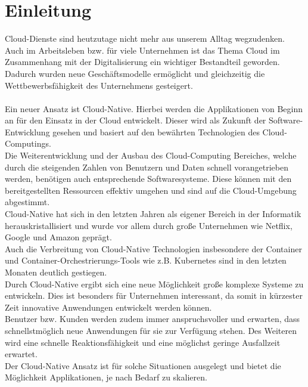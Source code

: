 \chapter{Einleitung}
Cloud-Dienste sind heutzutage nicht mehr aus unserem Alltag wegzudenken. Auch im Arbeitsleben bzw. für viele Unternehmen ist das Thema Cloud im Zusammenhang mit der Digitalisierung ein wichtiger Bestandteil geworden. Dadurch wurden neue Geschäftsmodelle ermöglicht und gleichzeitig die Wettbewerbsfähigkeit des Unternehmens gesteigert.\\
\\
Ein neuer Ansatz ist Cloud-Native. Hierbei werden die Applikationen von Beginn an für den Einsatz in der Cloud entwickelt. Dieser wird als Zukunft der Software-Entwicklung gesehen und basiert auf den bewährten Technologien des Cloud-Computings.\\
Die Weiterentwicklung und der Ausbau des Cloud-Computing Bereiches, welche durch die steigenden Zahlen von Benutzern und Daten schnell vorangetrieben werden, benötigen auch entsprechende Softwaresysteme. Diese können mit den bereitgestellten Ressourcen effektiv umgehen und sind auf die Cloud-Umgebung abgestimmt.\\
Cloud-Native hat sich in den letzten Jahren als eigener Bereich in der Informatik herauskristallisiert und wurde vor allem durch große Unternehmen wie Netflix, Google und Amazon geprägt.\\
Auch die Verbreitung von Cloud-Native Technologien insbesondere der Container und Container-Orchestrierungs-Tools wie z.B. Kubernetes sind in den letzten Monaten deutlich gestiegen.\\
Durch Cloud-Native ergibt sich eine neue Möglichkeit große komplexe Systeme zu entwickeln. Dies ist besonders für Unternehmen interessant, da somit in kürzester Zeit innovative Anwendungen entwickelt werden können.\\
Benutzer bzw. Kunden werden zudem immer anspruchsvoller und erwarten, dass schnellstmöglich neue Anwendungen für sie zur Verfügung stehen. Des Weiteren wird eine schnelle Reaktionsfähigkeit und eine möglichst geringe Ausfallzeit erwartet.\\
Der Cloud-Native Ansatz ist für solche Situationen ausgelegt und bietet die Möglichkeit Applikationen, je nach Bedarf zu skalieren.\\
\\